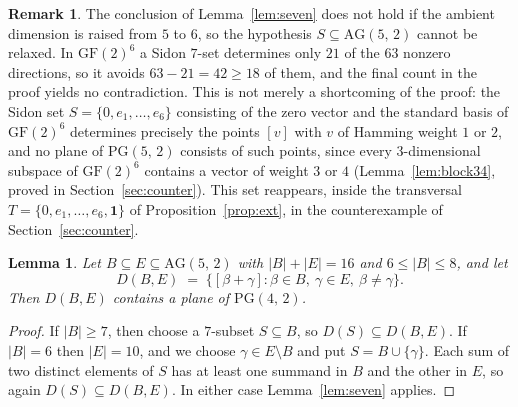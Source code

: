\documentclass[12pt]{article}
\newtheorem{lem}[thm]{Lemma}
\theoremstyle{definition}
\newtheorem{rem}[thm]{Remark}
\numberwithin{equation}{section}
\newcommand{\GF}[1]{\mathrm{GF}(#1)}
\newcommand{\PG}[2]{\mathrm{PG}(#1,\,#2)}
\newcommand{\AG}[2]{\mathrm{AG}(#1,\,#2)}
\newcommand{\onevec}{\mathbf{1}}
\begin{document}
\begin{rem}\label{rem:sevensharp}
The conclusion of Lemma~\ref{lem:seven} does not hold if the ambient dimension is raised from $5$ to $6$, so the hypothesis $S\subseteq\AG52$ cannot be relaxed.   In $\GF2^6$ a Sidon $7$-set determines only $21$ of the $63$ nonzero directions, so it avoids $63-21=42\geq18$ of them, and the final count  in the proof yields no contradiction.  This is not merely a shortcoming of the proof: the Sidon set $S=\{0,e_1,\ldots,e_6\}$ consisting of the zero vector and the standard basis of $\GF2^6$ determines precisely the points $[v]$ with $v$ of Hamming weight $1$ or $2$, and no plane of $\PG52$ consists of such points, since every $3$-dimensional subspace of $\GF2^6$ contains a vector of weight $3$ or $4$ (Lemma~\ref{lem:block34}, proved in Section~\ref{sec:counter}).  This set reappears, inside the transversal $T=\{0,e_1,\ldots,e_6,\onevec\}$ of Proposition~\ref{prop:ext}, in the counterexample of Section~\ref{sec:counter}.
\end{rem}

\begin{lem}\label{lem:BC}
Let $B\subseteq E\subseteq\AG52$ with $|B|+|E|=16$ and $6\le|B|\le8$, and let
\[
D(B,E)\;=\;\bigl\{[\beta+\gamma] : \beta\in B,\ \gamma\in E,\ \beta\neq\gamma\bigr\}.
\]
Then $D(B,E)$ contains a plane of $\PG42$.
\end{lem}

\begin{proof}
If $|B|\ge7$, then choose a $7$-subset $S\subseteq B$, so $D(S)\subseteq D(B,E)$.  %
If $|B|=6$ then $|E|=10$, and we choose $\gamma\in E\setminus B$ and put $S=B\cup\{\gamma\}$.  Each sum of two distinct elements of $S$ has at least one summand in $B$ and the other in $E$, so again $D(S)\subseteq D(B,E)$.  In either case Lemma~\ref{lem:seven} applies.
\end{proof}
\end{document}
